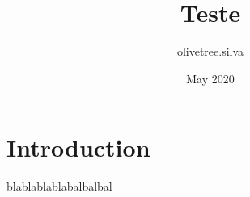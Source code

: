 \documentclass{article}
\title{Teste}
\author{olivetree.silva }
\date{May 2020}
\begin{document}
\maketitle

\section{Introduction}
blablablablabalbalbal
\end{document}
